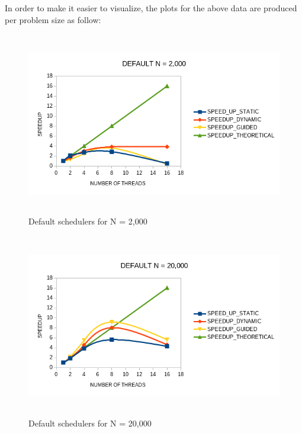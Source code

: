 \documentclass[12pt]{article}
\begin{document}
        \newpage
        In order to make it easier to visualize, the plots for the above data are produced per problem size as follow: 

        \begin{figure}[H]
            \hfill\includegraphics[width=150mm,height= 80mm]{speedup_2e3.png}\hspace*{\fill}
            \caption{Default schedulers for N = 2,000}
        \end{figure}        


        \begin{figure}[H]
            \hfill\includegraphics[width=150mm,height= 80mm]{speedup_2e4.png}\hspace*{\fill}
            \caption{Default schedulers for N = 20,000}
        \end{figure}        
\end{document}

